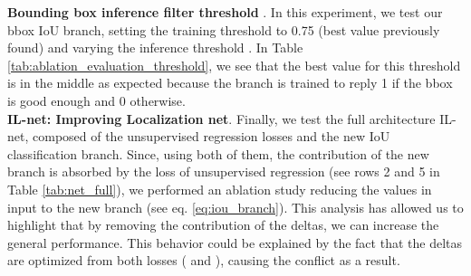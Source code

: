 \noindent\textbf{Bounding box inference filter threshold }.
In this experiment, we test our bbox IoU branch, setting the training threshold  to 0.75 (best value previously found) and varying the inference threshold .
In Table \ref{tab:ablation_evaluation_threshold}, we see that the best value for this threshold is in the middle as expected because the branch is trained to reply 1 if the bbox is good enough and 0 otherwise.\\



\noindent\textbf{IL-net: Improving Localization net}.
Finally, we test the full architecture IL-net, composed of the unsupervised regression losses and the new IoU classification branch.
Since, using both of them, the contribution of the new branch is absorbed by the loss of unsupervised regression (see rows 2 and 5 in Table \ref{tab:net_full}), we performed an ablation study reducing the values in input to the new branch (see eq. \ref{eq:iou_branch}).
This analysis has allowed us to highlight that by removing the contribution of the deltas, we can increase the general performance.
This behavior could be explained by the fact that the deltas are optimized from both losses ( and ), causing the conflict as a result.



